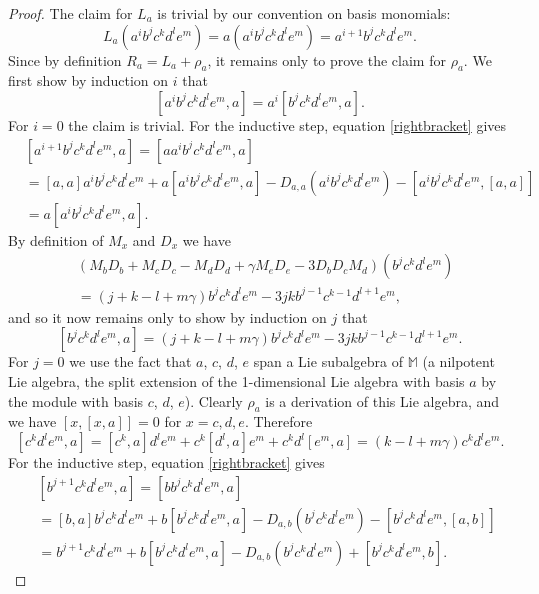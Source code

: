 \documentclass{amsart}
\theoremstyle{plain}
\theoremstyle{definition}
\begin{document}
\begin{proof}
The claim for $L_a$ is trivial by our convention on basis monomials:
  \[
  L_a ( a^i b^j c^k d^l e^m )
  =
  a ( a^i b^j c^k d^l e^m )
  =
  a^{i+1} b^j c^k d^l e^m.
  \]
Since by definition $R_a = L_a + \rho_a$, it remains only to prove the claim
for $\rho_a$. We first show by induction on $i$ that
  \[
  [ a^i b^j c^k d^l e^m, a ]
  =
  a^i [ b^j c^k d^l e^m, a ].
  \]
For $i = 0$ the claim is trivial.  For the inductive step, equation
\eqref{rightbracket} gives
  \allowdisplaybreaks
  \begin{align*}
  &
  [ a^{i+1} b^j c^k d^l e^m, a ]
  =
  [ a a^i b^j c^k d^l e^m, a ]
  \\
  &=
  [a,a] a^i b^j c^k d^l e^m
  +
  a [ a^i b^j c^k d^l e^m, a ]
  -
  D_{a,a} ( a^i b^j c^k d^l e^m )
  -
  [ a^i b^j c^k d^l e^m, [a,a] ]
  \\
  &=
  a [ a^i b^j c^k d^l e^m, a ].
  \end{align*}
By definition of $M_x$ and $D_x$ we have
  \allowdisplaybreaks
  \begin{align*}
  &
  ( M_b D_b + M_c D_c - M_d D_d + \gamma M_e D_e - 3 D_b D_c M_d )
  ( b^j c^k d^l e^m )
  \\
  &=
  ( j+k-l+m \gamma ) b^j c^k d^l e^m
  -
  3 j k b^{j-1} c^{k-1} d^{l+1} e^m,
  \end{align*}
and so it now remains only to show by induction on $j$ that
  \[
  [ b^j c^k d^l e^m, a ]
  =
  ( j+k-l+m \gamma ) b^j c^k d^l e^m
  -
  3 j k b^{j-1} c^{k-1} d^{l+1} e^m.
  \]
For $j = 0$ we use the fact that $a$, $c$, $d$, $e$ span a Lie subalgebra of
$\mathbb{M}$ (a nilpotent Lie algebra, the split extension of the 1-dimensional
Lie algebra with basis $a$ by the module with basis $c$, $d$, $e$). Clearly
$\rho_a$ is a derivation of this Lie algebra, and we have $[x,[x,a]] = 0$ for
$x  = c, d, e$. Therefore
  \[
  [ c^k d^l e^m, a ]
  =
  [ c^k, a ] d^l e^m + c^k [ d^l, a ] e^m + c^k d^l [ e^m, a ]
  =
  ( k - l + m \gamma ) c^k d^l e^m.
  \]
For the inductive step, equation \eqref{rightbracket} gives
  \allowdisplaybreaks
  \begin{align*}\
  &
  [ b^{j+1} c^k d^l e^m, a ]
  =
  [ b b^j c^k d^l e^m, a ]
  \\
  &=
  [b,a] b^j c^k d^l e^m
  +
  b [ b^j c^k d^l e^m, a ]
  -
  D_{a,b}( b^j  c^k d^l e^m )
  -
  [ b^j c^k d^l e^m, [a,b] ]
  \\
  &=
  b^{j+1} c^k d^l e^m
  +
  b [ b^j c^k d^l e^m, a ]
  -
  D_{a,b}( b^j  c^k d^l e^m )
  +
  [ b^j c^k d^l e^m, b ].
  \end{align*}

\end{proof}
\end{document}
